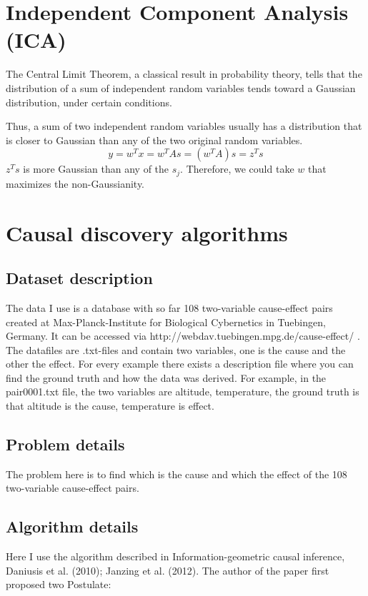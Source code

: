 \documentclass{article}
\theoremstyle{definition}
\numberwithin{equation}{section}
\numberwithin{figure}{section}
\begin{document}
\section{Independent Component Analysis (ICA)}
 The Central Limit Theorem, a classical result in probability
theory, tells that the distribution of a sum of independent random
variables tends toward a Gaussian distribution, under certain
conditions.

Thus, a sum of two independent random variables usually has a
distribution that is closer to Gaussian than any of the two original
random variables.
\begin{equation}
y=w^Tx=w^TAs=(w^TA)s=z^Ts
\end{equation}
$z^Ts$ is more Gaussian than any of the $s_j$. Therefore, we could take $w$ that maximizes
the non-Gaussianity.


\section{Causal discovery algorithms}
\subsection{Dataset description}
The data I use is a database with so far 108 two-variable cause-effect pairs 
created at Max-Planck-Institute for Biological Cybernetics in Tuebingen, Germany. It can be accessed via http://webdav.tuebingen.mpg.de/cause-effect/ . The datafiles are .txt-files and contain two variables, one is the cause and the other the effect. For every example there exists a description file where you can find the ground truth and how the data was derived. For example, in the pair0001.txt file, the two variables are altitude, temperature, the ground truth is that altitude is the cause, temperature is effect.
\subsection{Problem details}
The problem here is to find which is the cause and which the effect of the 108 two-variable cause-effect pairs.

\subsection{Algorithm details}
Here I use the algorithm described in Information-geometric causal inference, Daniusis et al. (2010); Janzing et al. (2012). The author of the paper first proposed two Postulate:
\end{document}
